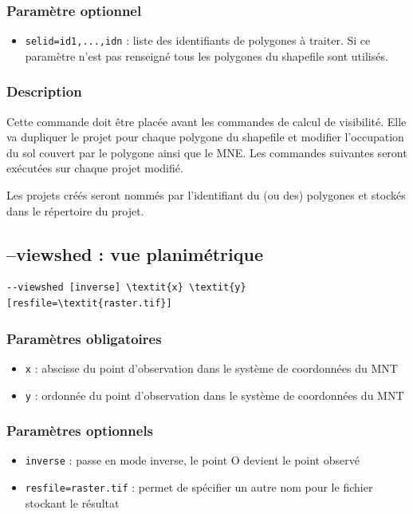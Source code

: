 \documentclass{report}
\begin{document}
\subsubsection{Paramètre optionnel}
\begin{itemize}
	\item \verb|selid=id1,...,idn| : liste des identifiants de polygones à traiter. Si ce paramètre n'est pas renseigné tous les polygones du shapefile sont utilisés.
\end{itemize}

\subsubsection{Description}
Cette commande doit être placée avant les commandes de calcul de visibilité. Elle va dupliquer le projet pour chaque polygone du shapefile et modifier l'occupation du sol couvert par le polygone ainsi que le MNE. Les commandes suivantes seront exécutées sur chaque projet modifié.

Les projets créés seront nommés par l'identifiant du (ou des) polygones et stockés dans le répertoire du projet.

\subsection{--viewshed : vue planimétrique}
\begin{Verbatim}[commandchars=\\\{\}]
--viewshed [inverse] \textit{x} \textit{y} [resfile=\textit{raster.tif}]
\end{Verbatim}

\subsubsection{Paramètres obligatoires}
\begin{itemize}
	\item \verb|x| : abscisse du point d'observation dans le système de coordonnées du MNT
	\item \verb|y| : ordonnée du point d'observation dans le système de coordonnées du MNT
\end{itemize}

\subsubsection{Paramètres optionnels}
\begin{itemize}
	\item \verb|inverse| : passe en mode inverse, le point O devient le point observé
	\item \verb|resfile=raster.tif| : permet de spécifier un autre nom pour le fichier stockant le résultat
\end{itemize}
\end{document}
